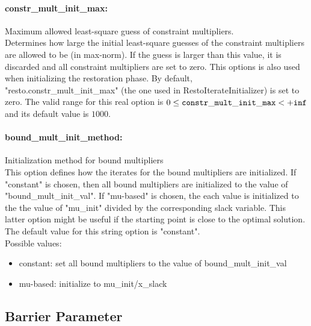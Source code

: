 \paragraph{constr\_mult\_init\_max:}\label{opt:constr_mult_init_max} Maximum allowed least-square guess of constraint multipliers. \\
 Determines how large the initial least-square guesses of the constraint multipliers are allowed to be (in max-norm). If the guess is larger than this value, it is discarded and all constraint multipliers are set to zero.  This options is also used when initializing the restoration phase. By default, "resto.constr\_mult\_init\_max" (the one used in RestoIterateInitializer) is set to zero. The valid range for this real option is 
$0 \le {\tt constr\_mult\_init\_max } <  {\tt +inf}$
and its default value is $1000$.


\paragraph{bound\_mult\_init\_method:}\label{opt:bound_mult_init_method} Initialization method for bound multipliers \\
 This option defines how the iterates for the bound multipliers are initialized.  If "constant" is chosen, then all bound multipliers are initialized to the value of "bound\_mult\_init\_val".  If "mu-based" is chosen, the each value is initialized to the the value of "mu\_init" divided by the corresponding slack variable.  This latter option might be useful if the starting point is close to the optimal solution. The default value for this string option is "constant".
\\ 
Possible values:
\begin{itemize}
   \item constant: set all bound multipliers to the value of bound\_mult\_init\_val
   \item mu-based: initialize to mu\_init/x\_slack
\end{itemize}

\subsection{Barrier Parameter}

